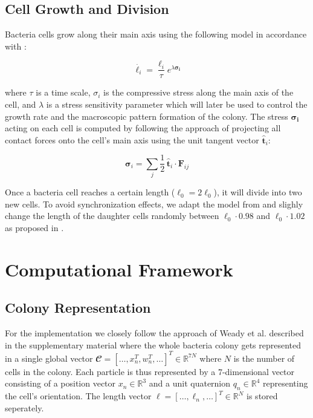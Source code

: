 \documentclass[conference]{IEEEtran}
\begin{document}
\subsection{Cell Growth and Division}

Bacteria cells grow along their main axis using the following model in accordance with \cite{Weady2024}:

\begin{equation}
    \dot{{\ell_i}} =  \frac{{\ell_i}}{\tau} e^{\lambda \boldsymbol{\sigma_i}}
\end{equation}


where $\tau$ is a time scale, $\sigma_i$ is the compressive stress along the main axis of the cell, and $\lambda$ is a stress sensitivity parameter which will later be used to control the growth rate and the macroscopic pattern formation of the colony. The stress $\boldsymbol{\sigma_i}$ acting on each cell is computed by following the approach of \cite{Weady2024} projecting all contact forces onto the cell's main axis using the unit tangent vector $\hat{\mathbf{t}}_i$:

\begin{equation}
    \boldsymbol{\sigma}_i = \sum_{j} \frac{1}{2}\, \hat{\mathbf t}_i\!\cdot\!\mathbf F_{ij}
\end{equation}
\label{eq:stress}

Once a bacteria cell reaches a certain length ($\ell_0 = 2\ell_0$), it will divide into two new cells. To avoid synchronization effects, we adapt the model from \cite{Weady2024} and slighly change the length of the daughter cells randomly between $\ell_0 \cdot 0.98$ and $\ell_0 \cdot 1.02$ as proposed in \cite{Khan_2024}.

\newpage

\section{Computational Framework}

\subsection{Colony Representation}

For the implementation we closely follow the approach of Weady et al. \cite{Weady2024} described in the supplementary material where the whole bacteria colony gets represented in a single global vector $\mathbfcal{C} = [\dots, x_n^T, w_n^T, \dots]^T \in \mathbb{R}^{7N}$ where $N$ is the number of cells in the colony. Each particle is thus represented by a 7-dimensional vector consisting of a position vector $x_n \in \mathbb{R}^3$ and a unit quaternion $q_n \in \mathbb{R}^4$ representing the cell's orientation. The length vector $\boldsymbol{\ell} = [\dots, \ell_n, \dots]^T \in \mathbb{R}^{N}$ is stored seperately.
\end{document}
